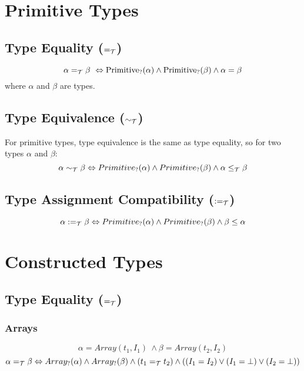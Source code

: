 \documentclass[]{article}
\begin{document}
\section{Primitive Types}

\subsection{Type Equality ($=_{\cal T}$)}

\[
\alpha =_{\cal T} \beta\ \Leftrightarrow \mbox{Primitive}_?(\alpha) \wedge \mbox{Primitive}_?(\beta) \wedge \alpha = \beta
\]
where $\alpha$ and $\beta$ are types.

\subsection{Type Equivalence ($\sim_{\cal T}$)}

For primitive types, type equivalence is the same as type equality, so for two types $\alpha$ and $\beta$:
\[
\alpha \sim_{\cal T} \beta \Leftrightarrow Primitive_?(\alpha) \wedge Primitive_?(\beta) \wedge \alpha \leq_{\cal T} \beta
\]


\subsection{Type Assignment Compatibility ($:=_{\cal T}$)}

\[
\alpha :=_{\cal T} \beta \Leftrightarrow Primitive_?(\alpha) \wedge Primitive_?(\beta) \wedge  \beta \leq \alpha
\]




\section{Constructed Types}

\subsection{Type Equality ($=_{\cal T}$)}

\subsubsection{Arrays}
\[
\alpha = Array(t_1, I_1)\ \wedge \beta =  Array(t_2, I_2)
\]
\[
\alpha =_{\cal T} \beta \Leftrightarrow Array_?(\alpha) \wedge Array_?(\beta) \wedge (t_1 =_{\cal T} t_2) \wedge ((I_1 = I_2) \vee (I_1 = \bot) \vee (I_2 = \bot))
\]
\end{document}
